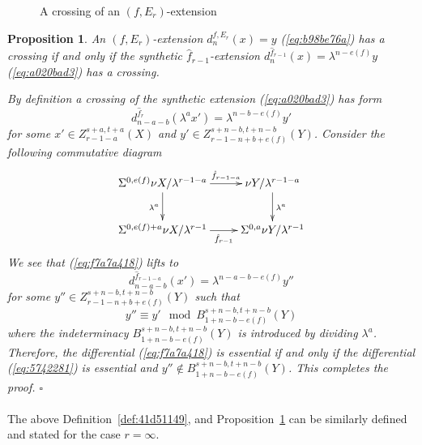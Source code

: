 \documentclass[12pt,a4paper]{article}
\renewenvironment{proof}{{\noindent\it\textbf{Proof}}\quad\it}{\hfill$\square$}
\newtheorem{proposition}[equation]{Proposition}
\newcommand{\Sus}{\Sigma}
\begin{document}
\begin{sloppy}
\begin{figure}[h]
{
}
\caption{A crossing of an $(f,E_r)$-extension}\label{fig:66241bf6}
\end{figure}

\begin{proposition}\label{prop:cross-f-Er}
    An $(f,E_r)$-extension $d_{n}^{f,E_r}(x)=y$ (\ref{eq:b98be76a}) has a crossing if and only if the synthetic $\hat f_{r-1}$-extension $d_{n}^{\hat f_{r-1}}(x)=\lambda^{n-e(f)} y$ (\ref{eq:a020bad3}) has a crossing.
\end{proposition}

\begin{proof}
    By definition a crossing of the synthetic extension (\ref{eq:a020bad3}) has form
    \begin{equation}\label{eq:f7a7a418}
        d_{n-a-b}^{\hat f_r}(\lambda^ax')=\lambda^{n-b-e(f)}y'
    \end{equation}
    for some $x'\in Z_{r-1-a}^{s+a,t+a}(X)$ and $y'\in Z_{r-1-n+b+e(f)}^{s+n-b,t+n-b}(Y)$. Consider the following commutative diagram
    $$\xymatrix{
        \Sus^{0,e(f)}\nu X/\lambda^{r-1-a} \ar[r]^-{\hat f_{r-1-a}} \ar[d]_{\lambda^a} & \nu Y/\lambda^{r-1-a} \ar[d]^{\lambda^a}\\
        \Sus^{0,e(f)+a}\nu X/\lambda^{r-1}\ar[r]_-{\hat f_{r-1}} & \Sus^{0,a}\nu Y/\lambda^{r-1}\\
    }$$
    We see that (\ref{eq:f7a7a418}) lifts to
    \begin{equation}\label{eq:5742281}
        d_{n-a-b}^{\hat f_{r-1-a}}(x')= \lambda^{n-a-b-e(f)}y''
    \end{equation}
    for some $y''\in Z_{r-1-n+b+e(f)}^{s+n-b,t+n-b}(Y)$ such that
    $$y''\equiv y'\mod B_{1+n-b-e(f)}^{s+n-b,t+n-b}(Y)$$
    where the indeterminacy $B_{1+n-b-e(f)}^{s+n-b,t+n-b}(Y)$ is introduced by dividing $\lambda^a$.
    Therefore, the differential (\ref{eq:f7a7a418}) is essential if and only if the differential (\ref{eq:5742281}) is essential and $y''\notin B_{1+n-b-e(f)}^{s+n-b,t+n-b}(Y)$. This completes the proof.
\end{proof}

\paragraph{}
The above Definition~\ref{def:41d51149}, and Proposition~\ref{prop:cross-f-Er} can be similarly defined and stated for the case $r=\infty$.


\end{sloppy}
\end{document}
